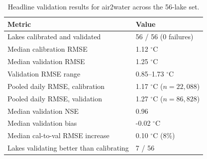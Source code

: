 \begin{table}[t]
\centering
\caption{Headline validation results for air2water across the 56-lake set.}
\label{tab:temp_results_summary}
\begin{tabular}{ll}
\hline
Metric & Value \\
\hline
Lakes calibrated and validated & 56 / 56 (0 failures) \\
Median calibration RMSE & 1.12 $^{\circ}$C \\
Median validation RMSE & 1.25 $^{\circ}$C \\
Validation RMSE range & 0.85--1.73 $^{\circ}$C \\
Pooled daily RMSE, calibration & 1.17 $^{\circ}$C ($n=22,088$) \\
Pooled daily RMSE, validation & 1.27 $^{\circ}$C ($n=86,828$) \\
Median validation NSE & 0.96 \\
Median validation bias & -0.02 $^{\circ}$C \\
Median cal-to-val RMSE increase & 0.10 $^{\circ}$C (8\%) \\
Lakes validating better than calibrating & 7 / 56 \\
\hline
\end{tabular}
\end{table}
